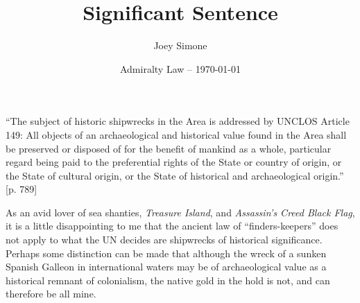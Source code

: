 \documentclass{article}[12pt,letterpaper]
\title{Significant Sentence}
\author{Joey Simone}
\date{Admiralty Law -- \today}
\begin{document}
\begin{flushleft}
\thetitle

\thedate

\theauthor
\end{flushleft}

``The subject of historic shipwrecks in the Area is addressed by UNCLOS Article 149: All objects of an archaeological and historical value found in the Area shall be preserved or disposed of for the benefit of mankind as a whole, particular regard being paid to the preferential rights of the State or country of origin, or the State of cultural origin, or the State of historical and archaeological origin.'' [p. 789]

As an avid lover of sea shanties, \textit{Treasure Island}, and \textit{Assassin's Creed Black Flag}, it is a little disappointing to me that the ancient law of ``finders-keepers'' does not apply to what the UN decides are shipwrecks of historical significance.
Perhaps some distinction can be made that although the wreck of a sunken Spanish Galleon in international waters may be of archaeological value as a historical remnant of colonialism, the native gold in the hold is not, and can therefore be all mine.

\printbibliography
\end{document}
